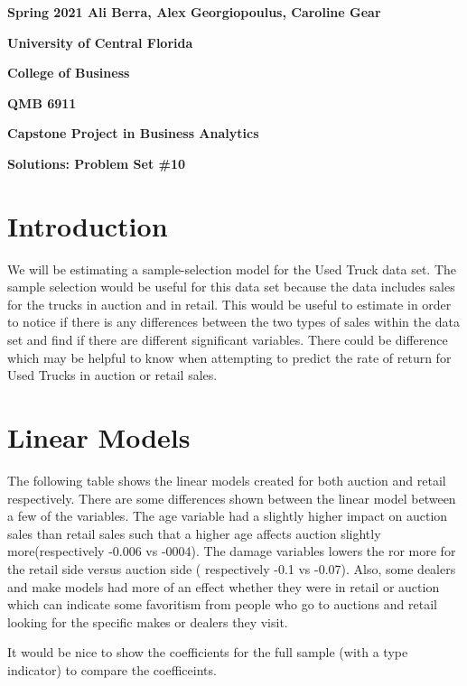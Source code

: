 \documentclass{paper}
\begin{document}
\pagestyle{empty}

{\noindent\bf Spring 2021 \hfill Ali Berra, Alex Georgiopoulus, Caroline Gear}

\vskip 16pt

\centerline{\bf University of Central Florida}

\centerline{\bf College of Business}

\vskip 16pt

\centerline{\bf QMB 6911}

\centerline{\bf Capstone Project in Business Analytics}

\vskip 10pt

\centerline{\bf Solutions:  Problem Set \#10}

\vskip 32pt

\noindent

\section{Introduction}
We will be estimating a sample-selection model for the Used Truck data set.  The sample selection would be useful for this data set because the data includes sales for the trucks in auction and in retail.  This would be useful to estimate in order to notice if there is any differences between the two types of sales within the data set and find if there are different significant variables.  There could be difference which may be helpful to know when attempting to predict the rate of return for Used Trucks in auction or retail sales.  

\section{Linear Models}
The following table shows the linear models created for both auction and retail respectively.  There are some differences shown between the linear model between a few of the variables.  The age variable had a slightly higher impact on auction sales than retail sales such that a higher age affects auction slightly more(respectively -0.006 vs -0004).  The damage variables lowers the ror more for the retail side versus auction side ( respectively -0.1 vs -0.07).  Also, some dealers and make models had more of an effect whether they were in retail or auction which can indicate some favoritism from people who go to auctions and retail looking for the specific makes or dealers they visit.

{\color{red}
It would be nice to show the coefficients for the full sample (with a type indicator)
to compare the coefficeints.
}

\pagebreak
\end{document}
